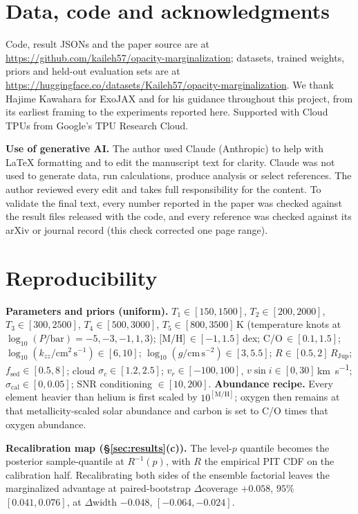 \documentclass{article}
\begin{document}
\FloatBarrier




\section*{Data, code and acknowledgments}
Code, result JSONs and the paper source are at
\url{https://github.com/kaileh57/opacity-marginalization}; datasets, trained
weights, priors and held-out evaluation sets are at
\url{https://huggingface.co/datasets/Kaileh57/opacity-marginalization}.
We thank Hajime Kawahara for ExoJAX and for his guidance throughout this
project, from its earliest framing to the experiments reported here.
Supported with Cloud TPUs from Google's TPU Research Cloud.

\textbf{Use of generative AI.} The author used Claude (Anthropic) to help
with LaTeX formatting and to edit the manuscript text for clarity. Claude was
not used to generate data, run calculations, produce analysis or select
references. The author reviewed every edit and takes full responsibility for
the content. To validate the final text, every number reported in the paper
was checked against the result files released with the code, and every
reference was checked against its arXiv or journal record (this check
corrected one page range).

\appendix
\section{Reproducibility}
\label{app:repro}

\textbf{Parameters and priors (uniform).} $T_1\!\in\![150,1500]$,
$T_2\!\in\![200,2000]$, $T_3\!\in\![300,2500]$, $T_4\!\in\![500,3000]$,
$T_5\!\in\![800,3500]$\,K (temperature knots at
$\log_{10}(P/\mathrm{bar})=-5,-3,-1,1,3$); [M/H]\,$\in[-1,1.5]$\,dex;
C/O\,$\in[0.1,1.5]$; $\log_{10}(k_{zz}/\mathrm{cm^{2}\,s^{-1}})\!\in\![6,10]$;
$\log_{10}(g/\mathrm{cm\,s^{-2}})\!\in\![3,5.5]$;
$R\!\in\![0.5,2]\,R_{\mathrm{Jup}}$; $f_{\mathrm{sed}}\!\in\![0.5,8]$; cloud
$\sigma_c\!\in\![1.2,2.5]$; $v_r\!\in\![-100,100]$,
$v\sin i\!\in\![0,30]$\,\si{\km\per\s}; $\sigma_{\mathrm{cal}}\!\in\![0,0.05]$;
SNR conditioning $\in[10,200]$. \textbf{Abundance recipe.} Every element heavier
than helium is first scaled by $10^{[\mathrm{M/H}]}$; oxygen then remains at that
metallicity-scaled solar abundance and carbon is set to C/O times that oxygen
abundance.

\textbf{Recalibration map (\S\ref{sec:results}(c)).} The level-$p$ quantile
becomes the posterior sample-quantile at $R^{-1}(p)$, with $R$ the empirical PIT
CDF on the calibration half. Recalibrating both sides of the ensemble factorial
leaves the marginalized advantage at paired-bootstrap $\Delta$coverage $+0.058$,
$95\%$ $[0.041,0.076]$, at $\Delta$width $-0.048$, $[-0.064,-0.024]$.
\end{document}
